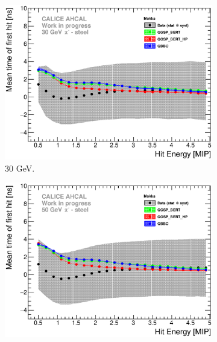 
\begin{figure}[htbp!]
  \begin{subfigure}[t]{0.49\textwidth}
    \centering
    \includegraphics[width=1\textwidth]{../Thesis_Plots/Timing/Pions/Plots/ComparisonToSim/Time_Energy_30GeV_Mokka.eps}
    \caption{30 GeV.}\label{fig:Energy_SimData_30GeV}
  \end{subfigure}
  \hfill
  \begin{subfigure}[t]{0.49\textwidth}
    \centering
    \includegraphics[width=1\textwidth]{../Thesis_Plots/Timing/Pions/Plots/ComparisonToSim/Time_Energy_50GeV_Mokka.eps}

\end{subfigure}
\end{figure}
